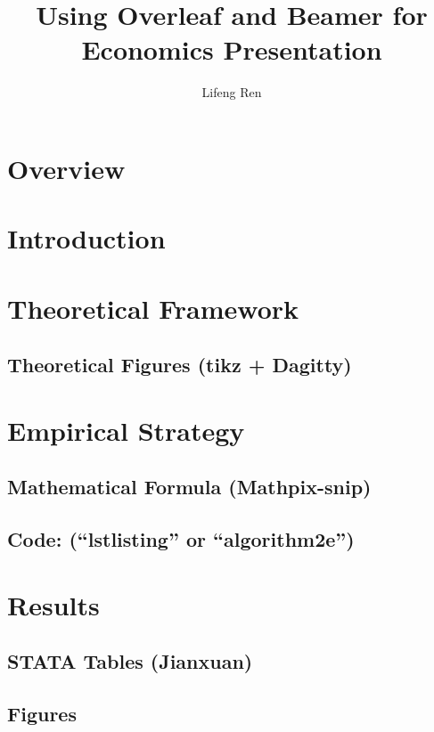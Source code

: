 \documentclass[11pt]{beamer}
\title[Overleaf and Beamer]{Using Overleaf and Beamer for Economics Presentation}
\author[Lifeng Ren]{Lifeng Ren}
\begin{document}


\section{Overview} %
    

    

\section{Introduction}
    


\section{Theoretical Framework} 
    \subsection{Theoretical Figures (tikz + Dagitty)}
    


\section{Empirical Strategy}
    \subsection{Mathematical Formula (Mathpix-snip)}
    

    \subsection{Code: (``lstlisting'' or ``algorithm2e'')}
    

\section{Results}
    \subsection{STATA Tables (Jianxuan)}
    


    \subsection{Figures}
    
\end{document}
